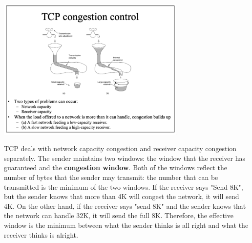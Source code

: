 \documentclass[11pt]{article}
\begin{document}
\begin{center}
    \includegraphics[width=0.7\textwidth]{tcpcongestioncontrol.png}
\end{center}

TCP deals with network capacity congestion and receiver capacity congestion separately. 
The sender maintains two windows: the window that the receiver has guaranteed and the \textbf{congestion window}.
Both of the windows reflect the number of bytes that the sender may transmit: the number that can be transmitted is the minimum of the two windows.
If the receiver says "Send 8K", but the sender knows that more than 4K will congest the network, it will send 4K. 
On the other hand, if the receiver says "send 8K" and the sender knows that the network can handle 32K, it will send the full 8K. 
Therefore, the effective window is the minimum between what the sender thinks is all right and what the receiver thinks is alright.
\end{document}
